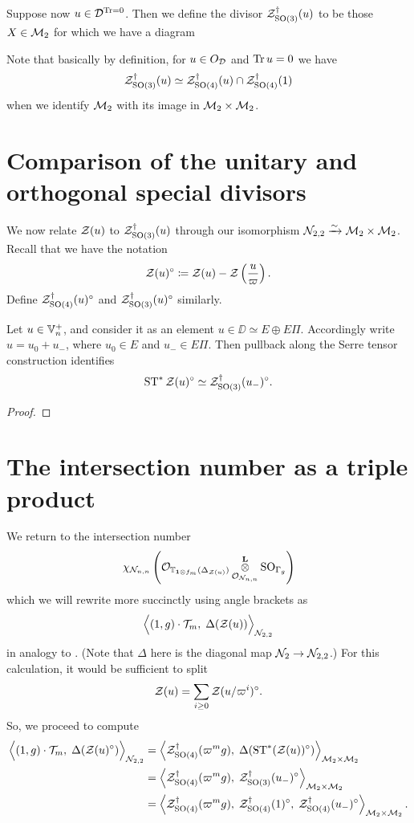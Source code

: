 \begin{definition}
  Suppose now $u \in \mathcal D^{\operatorname{Tr} = 0}$.
  Then we define the divisor $\mathcal Z^{\dagger}_{\operatorname{SO}(3)}(u)$ to be those $X \in \mathcal M_2$
  for which we have a diagram
  \begin{center}
  \end{center}
  Note that basically by definition, for $u \in O_\mathcal D$ and $\operatorname{Tr} u = 0$ we have
  \[ \mathcal Z^{\dagger}_{\operatorname{SO}(3)}(u) \simeq \mathcal Z^{\dagger}_{\operatorname{SO}(4)}(u) \cap \mathcal Z^{\dagger}_{\operatorname{SO}(4)}(1) \]
  when we identify $\mathcal M_2$ with its image in $\mathcal M_2 \times \mathcal M_2$.
\end{definition}

\section{Comparison of the unitary and orthogonal special divisors}
We now relate $\mathcal Z(u)$ to $\mathcal Z^{\dagger}_{\operatorname{SO}(3)}(u)$ through our
isomorphism $\mathcal N_{2,2} \xrightarrow{\sim} \mathcal M_2 \times \mathcal M_2$.
Recall that we have the notation
\[ \mathcal Z(u)^\circ \coloneqq \mathcal Z(u) - \mathcal Z\left( \frac{u}{\varpi} \right). \]
Define $\mathcal Z^{\dagger}_{\operatorname{SO}(4)}(u)^\circ$ and $\mathcal Z^{\dagger}_{\operatorname{SO}(3)}(u)^\circ$ similarly.

\begin{lemma}
  Let $u \in \mathbb V_n^+$, and consider it as an element $u \in \DD \simeq E \oplus E \Pi$.
  Accordingly write $u = u_0 + u_-$, where $u_0 \in E$ and $u_- \in E \Pi$.
  Then pullback along the Serre tensor construction identifies
  \[ \operatorname{ST}^\ast \mathcal Z(u)^\circ \simeq \mathcal Z^{\dagger}_{\operatorname{SO}(3)}(u_-)^\circ. \]
\end{lemma}
\begin{proof}
\end{proof}


\section{The intersection number as a triple product}
We return to the intersection number
\[ \chi_{\mathcal N_{n,n}} \left(
      \mathcal{O}_{\mathbb T_{\mathbf{1} \otimes f_m}(\Delta_{\mathcal Z(u)})}
      \mathop{\otimes}^{\mathbf{L}}_{\mathcal{O}_{\mathcal N_{n,n}}} \operatorname{SO}_{\Gamma_g} \right) \]
which we will rewrite more succinctly using angle brackets as
\[ \Big\langle (1,g) \cdot \mathcal{T}_m, \; \Delta(\mathcal Z(u)) \Big\rangle_{\mathcal N_{2,2}} \]
in analogy to \cite[\S6.1]{ref:AFLspherical}.
(Note that $\Delta$ here is the diagonal map $\mathcal N_2 \to \mathcal N_{2,2}$.)
For this calculation, it would be sufficient to split
\[ \mathcal Z(u) = \sum_{i \ge 0} \mathcal Z(u/\varpi^i)^\circ. \]
So, we proceed to compute
\begin{align*}
  \Big\langle (1,g) \cdot \mathcal{T}_m, \; \Delta(\mathcal Z(u)^\circ) \Big\rangle_{\mathcal N_{2,2}}
  &= \left< \mathcal Z^{\dagger}_{\operatorname{SO}(4)}(\varpi^m g), \; \Delta(\operatorname{ST}^\ast(\mathcal Z(u))^\circ) \right>_{\mathcal M_2 \times \mathcal M_2} \\
  &= \left< \mathcal Z^{\dagger}_{\operatorname{SO}(4)}(\varpi^m g), \; \mathcal Z^{\dagger}_{\operatorname{SO}(3)}(u_-)^\circ \right>_{\mathcal M_2 \times \mathcal M_2} \\
  &= \left< \mathcal Z^{\dagger}_{\operatorname{SO}(4)}(\varpi^m g), \; \mathcal Z^{\dagger}_{\operatorname{SO}(4)}(1)^\circ, \; \mathcal Z^{\dagger}_{\operatorname{SO}(4)}(u_-)^\circ \right>_{\mathcal M_2 \times \mathcal M_2}.
\end{align*}
